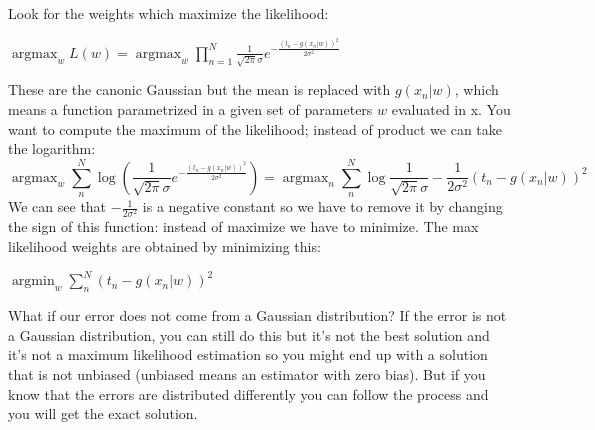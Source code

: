 Look for the weights which maximize the likelihood: 
\begin{center}
    $\operatorname{argmax}_{w} L(w)=\operatorname{argmax}_{w} \prod_{n=1}^{N} \frac{1}{\sqrt{2 \pi} \sigma} e^{-\frac{\left(t_{n}-g\left(x_{n} | w\right)\right)^{2}}{2 \sigma^{2}}}$
\end{center}
These are the canonic Gaussian but the mean is replaced with $g\left(x_{n} | w\right)$, which means a function parametrized in a given set of parameters $w$ evaluated in x. You want to compute the maximum of the likelihood; instead of product we can take the logarithm:
$$
\operatorname{argmax}_{w} \sum_{n}^{N} \log \left(\frac{1}{\sqrt{2 \pi} \sigma} e^{-\frac{\left(t_{n}-g\left(x_{n} | w\right)\right)^{2}}{2 \sigma^{2}}}\right)=\operatorname{argmax}_{n} \sum_{n}^{N} \log \frac{1}{\sqrt{2 \pi} \sigma}-\frac{1}{2 \sigma^{2}}\left(t_{n}-g\left(x_{n} | w\right)\right)^2
$$
We can see that $-\frac{1}{2 \sigma^{2}}$ is a negative constant so we have to remove it by changing the sign of this function: instead of maximize we have to minimize. The max likelihood weights are obtained by minimizing this:
\begin{center}
    $ \operatorname{argmin}_{w} \sum_{n}^{N}\left(t_{n}-g\left(x_{n} | w\right)\right)^{2} $
\end{center}
What if our error does not come from a Gaussian distribution? If the error is not a Gaussian distribution, you can still do this but it's not the best solution and it's not a maximum likelihood estimation so you might end up with a solution that is not unbiased (unbiased means an estimator with zero bias). 
But if you know that the errors are distributed differently you can follow the process and you will get the exact solution. 

